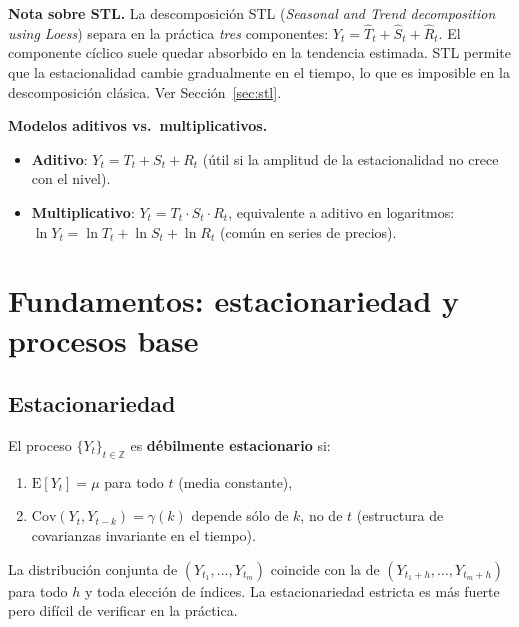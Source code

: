 \documentclass[12pt,a4paper]{article}
\theoremstyle{definition}
\begin{document}
\noindent\textbf{Nota sobre STL.} La descomposición STL (\textit{Seasonal and
Trend decomposition using Loess}) separa en la práctica \emph{tres}
componentes: $Y_t = \hat{T}_t + \hat{S}_t + \hat{R}_t$. El componente cíclico
suele quedar absorbido en la tendencia estimada.  STL permite que la
estacionalidad cambie gradualmente en el tiempo, lo que es imposible en la
descomposición clásica. Ver Sección~\ref{sec:stl}.

\medskip
\noindent\textbf{Modelos aditivos vs.\ multiplicativos.}
\begin{itemize}[nosep]
  \item \textbf{Aditivo}: $Y_t = T_t + S_t + R_t$ (útil si la amplitud de la
        estacionalidad no crece con el nivel).
  \item \textbf{Multiplicativo}: $Y_t = T_t \cdot S_t \cdot R_t$, equivalente
        a aditivo en logaritmos: $\ln Y_t = \ln T_t + \ln S_t + \ln R_t$
        (común en series de precios).
\end{itemize}

\section{Fundamentos: estacionariedad y procesos base}

\subsection{Estacionariedad}

\begin{defbox}
El proceso $\{Y_t\}_{t \in \mathbb{Z}}$ es \textbf{débilmente estacionario} si:
\begin{enumerate}[nosep]
  \item $\mathrm{E}[Y_t] = \mu$ para todo $t$ (media constante),
  \item $\mathrm{Cov}(Y_t, Y_{t-k}) = \gamma(k)$ depende sólo de $k$, no de $t$
        (estructura de covarianzas invariante en el tiempo).
\end{enumerate}
\end{defbox}

\begin{defbox}
La distribución conjunta de $(Y_{t_1}, \ldots, Y_{t_m})$ coincide con la de
$(Y_{t_1+h}, \ldots, Y_{t_m+h})$ para todo $h$ y toda elección de índices.
La estacionariedad estricta es más fuerte pero difícil de verificar en la práctica.
\end{defbox}
\end{document}
